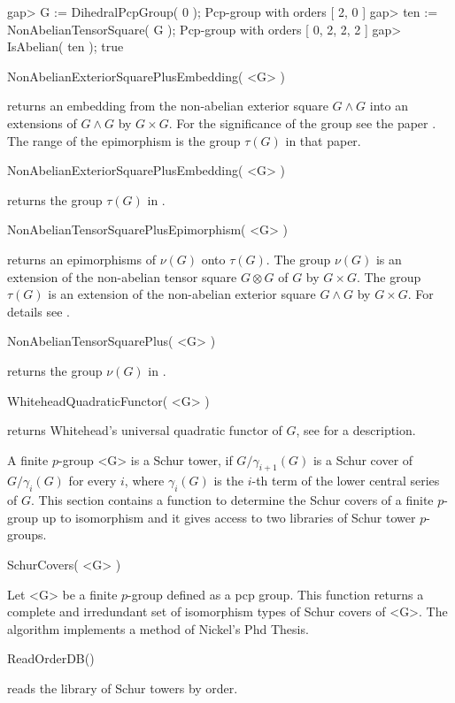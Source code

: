 gap> G := DihedralPcpGroup( 0 );
Pcp-group with orders [ 2, 0 ]
gap> ten := NonAbelianTensorSquare( G );
Pcp-group with orders [ 0, 2, 2, 2 ]
gap> IsAbelian( ten );
true
\endexample

\>NonAbelianExteriorSquarePlusEmbedding( <G> )

returns an embedding from  the non-abelian exterior square $G\wedge G$
into  an  extensions   of  $G\wedge  G$  by  $G\times   G$.   For  the
significance  of the  group  see the  paper \cite{EickNickel07}.   The
range of the epimorphism is the group $\tau(G)$ in that paper.

\>NonAbelianExteriorSquarePlusEmbedding( <G> )

returns the group $\tau(G)$ in \cite{EickNickel07}.

\>NonAbelianTensorSquarePlusEpimorphism( <G> )

returns  an  epimorphisms  of  $\nu(G)$  onto  $\tau(G)$.   The  group
$\nu(G)$ is an extension of the non-abelian tensor square $G\otimes G$
of $G$  by $G\times G$.   The group $\tau(G)$  is an extension  of the
non-abelian exterior  square $G\wedge G$ by $G\times  G$.  For details
see \cite{EickNickel07}.

\>NonAbelianTensorSquarePlus( <G> )

returns the group $\nu(G)$ in \cite{EickNickel07}.


\> WhiteheadQuadraticFunctor( <G> )

returns Whitehead's universal quadratic functor of $G$, see
\cite{EickNickel07} for a description.


A finite $p$-group <G> is a Schur tower, if $G/\gamma_{i+1}(G)$ is a
Schur cover of $G/\gamma_i(G)$ for every $i$, where $\gamma_i(G)$ is
the $i$-th term of the lower central series of $G$. This section 
contains a function to determine the Schur covers of a finite $p$-group
up to isomorphism and it gives access to two libraries of Schur tower
$p$-groups.

\>SchurCovers( <G> )

Let <G> be a finite $p$-group defined as a pcp group. This function
returns a complete and irredundant set of isomorphism types of Schur
covers of <G>. The algorithm implements a method of Nickel's Phd Thesis.

\> ReadOrderDB()

reads the library of Schur towers by order.


